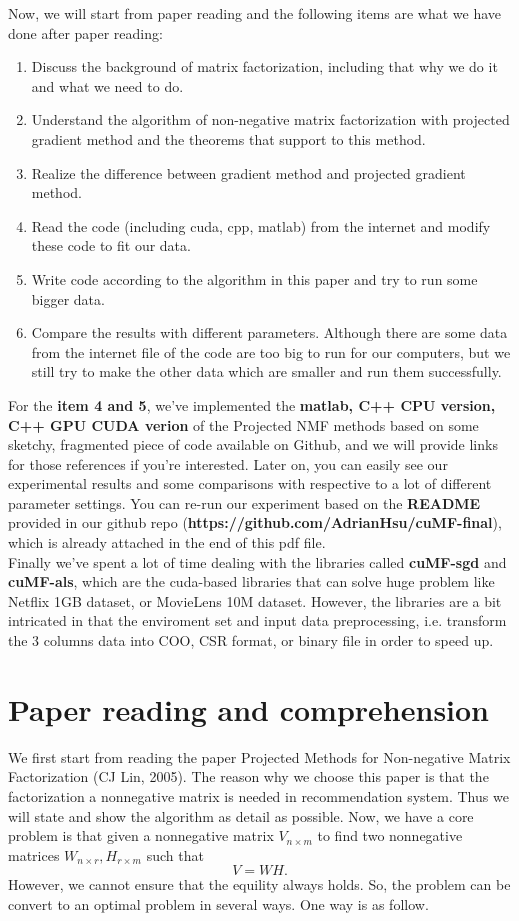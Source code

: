 \documentclass[12pt]{article}
\theoremstyle{remark}
\begin{document}
\begin{CJK}{UTF8}{bsmi}
Now, we will start from paper reading and the following items are what we have done after paper reading:
\begin{enumerate}
\item Discuss the background of matrix factorization, including that why we do it and what we need to do.
\item Understand the algorithm of non-negative matrix factorization with projected gradient method and the theorems that support to this method.
\item Realize the difference between gradient method and projected gradient method.
\item Read the code (including cuda, cpp, matlab) from the internet and modify these code to fit our data.
\item Write code according to the algorithm in this paper and try to run some bigger data.
\item Compare the results with different parameters. Although there are some data from the internet file of the code are too big to run for our computers, but we still try to make the other data which are smaller and run them successfully.
\end{enumerate}
For the \textbf{item 4 and 5}, we've implemented the \textbf{matlab, C++ CPU version, C++ GPU CUDA verion} of the Projected NMF methods based on some sketchy, fragmented piece of code available on Github, and we will provide links for those references if you're interested. Later on, you can easily see our experimental results and some comparisons with respective to a lot of different parameter settings. You can re-run our experiment based on the \textbf{README} provided in our github repo (\textbf{https://github.com/AdrianHsu/cuMF-final}), which is already attached in the end of this pdf file.\\
Finally we've spent a lot of time dealing with the libraries called \textbf{cuMF-sgd} and \textbf{cuMF-als}, which are the cuda-based libraries that can solve huge problem like Netflix 1GB dataset, or MovieLens 10M dataset. However, the libraries are a bit intricated in that the enviroment set and input data preprocessing, i.e. transform the 3 columns data into COO, CSR format, or binary file in order to speed up.
 \section{Paper reading and comprehension}
We first start from reading the paper Projected Methods for Non-negative Matrix Factorization (CJ Lin, 2005). The reason why we choose this paper is that the factorization a nonnegative matrix is needed in recommendation system. Thus we will state and show the algorithm as detail as possible. Now, we have a core problem is that given a nonnegative matrix $V_{n\times m}$ to find two nonnegative matrices $W_{n \times r},H_{r \times m}$ such that 
$$V=WH.$$ 
However, we cannot ensure that the equility always holds. So, the problem can be convert to an optimal problem in several ways. One way is as follow. 

\end{CJK}
\end{document}
